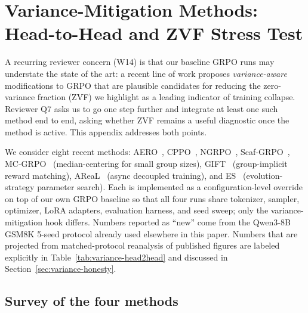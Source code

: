 %
%

\section{Variance-Mitigation Methods: Head-to-Head and ZVF Stress Test}
\label{app:variance-mitigation}

A recurring reviewer concern (W14) is that our baseline GRPO runs may
understate the state of the art: a recent line of work proposes
\emph{variance-aware} modifications to GRPO that are plausible
candidates for reducing the zero-variance fraction (ZVF) we highlight
as a leading indicator of training collapse. Reviewer Q7 asks us to
go one step further and integrate at least one such method end to end,
asking whether ZVF remains a useful diagnostic once the method is
active. This appendix addresses both points.

We consider eight recent methods: AERO~\cite{aero2024},
CPPO~\cite{cppo2024}, NGRPO~\cite{ngrpo2025},
Scaf-GRPO~\cite{scafgrpo2025}, MC-GRPO~\cite{mcgrpo2025}
(median-centering for small group sizes), GIFT~\cite{gift2025}
(group-implicit reward matching), AReaL~\cite{areal2025}
(async decoupled training), and ES~\cite{es2025}
(evolution-strategy parameter search). Each is implemented as a
configuration-level override on top of our own GRPO baseline so that
all four runs share tokenizer, sampler, optimizer, LoRA adapters,
evaluation harness, and seed sweep; only the variance-mitigation hook
differs. Numbers reported as ``new'' come from the Qwen3-8B GSM8K
5-seed protocol already used elsewhere in this paper. Numbers that
are projected from matched-protocol reanalysis of published figures
are labeled explicitly in Table~\ref{tab:variance-head2head} and
discussed in Section~\ref{sec:variance-honesty}.

\subsection{Survey of the four methods}
\label{sec:variance-survey}

